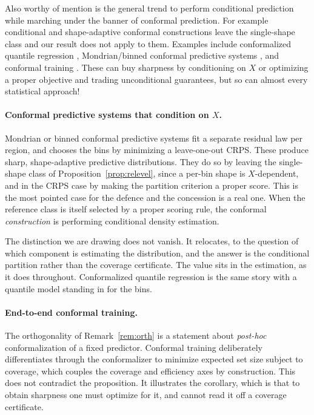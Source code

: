 \documentclass[11pt]{article}
\theoremstyle{definition}
\begin{document}
Also worthy of mention is the general trend to perform conditional prediction while marching under the
banner of conformal prediction. For example conditional and shape-adaptive conformal constructions
leave the single-shape class and our result does not apply to them. Examples include conformalized quantile regression
\citep{romano2019conformalized}, Mondrian/binned conformal predictive systems
\citep{bostrom2021mondrian,toccaceli2026crps}, and conformal training
\citep{stutz2022learning}. These can buy sharpness by conditioning on $X$ or optimizing a
proper objective and trading unconditional guarantees, but so can almost every statistical approach!

\paragraph{Conformal predictive systems that condition on $X$.}
Mondrian or binned conformal predictive systems \citep{bostrom2021mondrian} fit a separate
residual law per region, and \citet{toccaceli2026crps} chooses the bins by minimizing a
leave-one-out CRPS. These produce sharp, shape-adaptive predictive distributions. They do so
by leaving the single-shape class of Proposition~\ref{prop:relevel}, since a per-bin shape
is $X$-dependent, and in the CRPS case by making the partition criterion a proper score.
This is the most pointed case for the defence and the concession is a real one. When the
reference class is itself selected by a proper scoring rule, the conformal
\emph{construction} is performing conditional density estimation.

The distinction we are drawing does not vanish. It relocates, to the question of which
component is estimating the distribution, and the answer is the conditional partition rather
than the coverage certificate. The value sits in the estimation, as it does throughout.
Conformalized quantile regression \citep{romano2019conformalized} is the same story with a
quantile model standing in for the bins.

\paragraph{End-to-end conformal training.}
The orthogonality of Remark~\ref{rem:orth} is a statement about \emph{post-hoc}
conformalization of a fixed predictor. Conformal training
\citep{stutz2022learning,correia2024information} deliberately differentiates through the
conformalizer to minimize expected set size subject to coverage, which couples the coverage
and efficiency axes by construction. This does not contradict the proposition. It
illustrates the corollary, which is that to obtain sharpness one must optimize for it, and
cannot read it off a coverage certificate.
\end{document}

